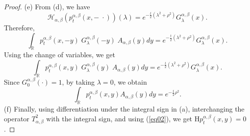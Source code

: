 \documentclass[a4paper,11pt, reqno]{amsart}
\theoremstyle{plain}
\theoremstyle{definition}
\theoremstyle{remark}
\def \R{{\mathbb R}}
\def\R{\mathbb R}
\def \H{{\mathcal H}}
\begin{document}
\begin{proof}
(e) From (d), we have 
\[ \H_{\alpha, \beta} \left( p_t^{\alpha, \beta}(x, - \; \cdot) \right) (\lambda) = e^{-\frac{t}{2}\left( \lambda^2+\rho^2\right)} G^{\alpha, \beta}_\lambda(x). \]
Therefore,
\[ \int_{\R} p_t^{\alpha, \beta}(x, -y) \; G^{\alpha, \beta}_\lambda(-y) \; A_{\alpha, \beta} (y) dy = e^{-\frac{t}{2}\left( \lambda^2+\rho^2\right)} G^{\alpha, \beta}_\lambda(x). \]
Using the change of variables, we get
\[\int_{\R} p_t^{\alpha, \beta}(x, y) \; G^{\alpha, \beta}_\lambda(y) \; A_{\alpha, \beta} (y) dy = e^{-\frac{t}{2}\left( \lambda^2+\rho^2\right)} G^{\alpha, \beta}_\lambda(x). \]
Since $G^{\alpha, \beta}_0(\cdot)=1$, by taking $\lambda=0$, we obtain
\[ \int_{\R} p_t^{\alpha, \beta}(x, y) A_{\alpha, \beta} (y) dy = e^{-\frac{t}{2} \rho^2}. \] 
(f) Finally, using differentiation under the integral sign in (a), interchanging the operator $T^2_{\alpha, \beta}$ with the integral sign, and using (\ref{eq02}), we get  $\mathrm{H} p_t^{\alpha, \beta}(x, y) = 0$.
\end{proof}
\end{document}
